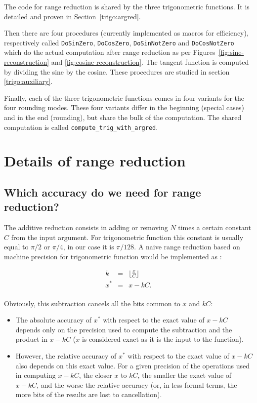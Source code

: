 The code for range reduction is shared by the three
trigonometric functions. It is detailed and proven in
Section~\ref{trigo:argred}.

Then there are four procedures (currently implemented as macros for
efficiency), respectively called \texttt{DoSinZero},
\texttt{DoCosZero}, \texttt{DoSinNotZero} and \texttt{DoCosNotZero}
which do the actual computation after range reduction as per
Figures~\ref{fig:sine-reconstruction} and
\ref{fig:cosine-reconstruction}. The tangent function is computed by
dividing the sine by the cosine. These procedures are studied in
section \ref{trigo:auxiliary}.

Finally, each of the three trigonometric functions comes in four
variants for the four rounding modes. These four variants differ in
the beginning (special cases) and in the end (rounding), but share the
bulk of the computation. The shared computation is called
\verb!compute_trig_with_argred!.




\section{Details of range reduction
\label{trigo:argred}}

\subsection{Which accuracy do we need for range reduction?}

The additive reduction consists in adding or removing $N$ times a
certain constant $C$ from the input argument. For trigonometric
function this constant is usually equal to $\pi/2$ or $\pi/4$, in our
case it is $\pi/128$. A naive range reduction based on
machine precision for trigonometric function would be implemented as :

\begin{equation}
\begin{array}{rcl}
k    &=&  \lfloor \frac{x}{C} \rfloor \\
x^*  &=&  x-kC. \\
\end{array}
\label{chap6:eqn:rangereduction}
\end{equation}

Obviously, this subtraction cancels all the bits common to $x$ and $kC$:
\begin{itemize}
\item The absolute accuracy of $x^*$ with respect to the exact value
  of $x-kC$ depends only on the precision used to compute the subtraction
  and the product in $x-kC$ ($x$ is considered exact as it is the
  input to the function).

\item However, the relative accuracy of $x^*$ with respect to the
  exact value of $x-kC$ also depends on this exact value. For a given
  precision of the operations used in computing $x-kC$, the closer $x$
  to $kC$, the smaller the exact value of $x-kC$, and the worse the
  relative accuracy (or, in less formal terms, the more bits of the
  results are lost to cancellation).
\end{itemize}

